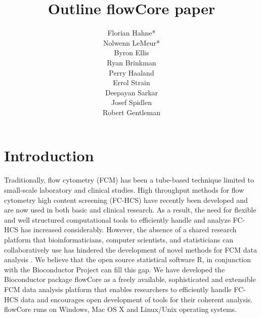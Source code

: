 \documentclass[12pt]{article}
\title{Outline flowCore paper}
\author{Florian Hahne*\\
  Nolwenn LeMeur*\\
  Byron Ellis\\
  Ryan Brinkman\\
  Perry Haaland\\
  Errol Strain\\
  Deepayan Sarkar\\
  Josef Spidlen\\
  Robert Gentleman
 }
\begin{document}
\maketitle

\section*{Introduction}
Traditionally, flow cytometry (FCM) has been a tube-based technique
limited to small-scale laboratory and clinical studies.  High
throughput methods for flow cytometry high content screening (FC-HCS)
have recently been developed and are now used in both basic and
clinical research. As a result, the need for flexible and well
structured computational tools to efficiently handle and analyze
FC-HCS has increased considerably.
However, the absence of a shared research platform that
bioinformaticians, computer scientists, and statisticians can collaboratively
use has hindered the development of novel methods 
for FCM data analysis \citep{lizard2007fca}.
We believe that the open source statistical
software R, in conjunction with the Bioconductor Project can fill this
gap.  
We have developed the Bioconductor package flowCore as a freely available,
sophisticated and extensible FCM data analysis platform that enables
researchers to efficiently handle FC-HCS data and encourages open
development of tools for their coherent analysis. 
flowCore runs on Windows, Mac OS X and Linux/Unix operating
systems.
\end{document}
